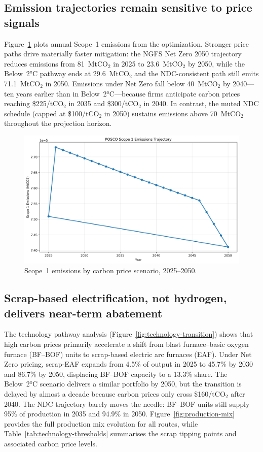 \documentclass[preprint,1p,authoryear]{elsarticle}
\begin{document}
\subsection{Emission trajectories remain sensitive to price signals}

Figure~\ref{fig:scope1-by-scenario} plots annual Scope~1 emissions from the optimization. Stronger price paths drive materially faster mitigation: the NGFS Net Zero 2050 trajectory reduces emissions from 81~MtCO$_2$ in 2025 to 23.6~MtCO$_2$ by 2050, while the Below~2°C pathway ends at 29.6~MtCO$_2$ and the NDC-consistent path still emits 71.1~MtCO$_2$ in 2050. Emissions under Net Zero fall below 40~MtCO$_2$ by 2040—ten years earlier than in Below~2°C—because firms anticipate carbon prices reaching \$225/tCO$_2$ in 2035 and \$300/tCO$_2$ in 2040. In contrast, the muted NDC schedule (capped at \$100/tCO$_2$ in 2050) sustains emissions above 70~MtCO$_2$ throughout the projection horizon.

\begin{figure}[!t]
  \centering
  \includegraphics[width=0.8\linewidth]{scope1_by_scenario}
  \caption{Scope~1 emissions by carbon price scenario, 2025--2050.}
  \label{fig:scope1-by-scenario}
\end{figure}

\subsection{Scrap-based electrification, not hydrogen, delivers near-term abatement}

The technology pathway analysis (Figure~\ref{fig:technology-transition}) shows that high carbon prices primarily accelerate a shift from blast furnace--basic oxygen furnace (BF--BOF) units to scrap-based electric arc furnaces (EAF). Under Net Zero pricing, scrap-EAF expands from 4.5\% of output in 2025 to 45.7\% by 2030 and 86.7\% by 2050, displacing BF--BOF capacity to a 13.3\% share. The Below~2°C scenario delivers a similar portfolio by 2050, but the transition is delayed by almost a decade because carbon prices only cross \$160/tCO$_2$ after 2040. The NDC trajectory barely moves the needle: BF--BOF units still supply 95\% of production in 2035 and 94.9\% in 2050. Figure~\ref{fig:production-mix} provides the full production mix evolution for all routes, while Table~\ref{tab:technology-thresholds} summarises the scrap tipping points and associated carbon price levels.
\end{document}
